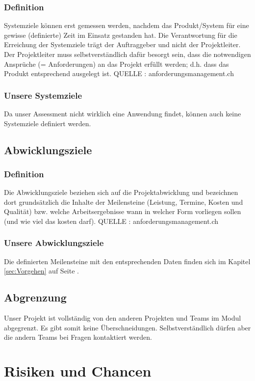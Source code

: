\subsubsection{Definition}
Systemziele können erst gemessen werden, nachdem das Produkt/System für eine gewisse (definierte) Zeit im Einsatz gestanden hat. Die Verantwortung für die Erreichung der Systemziele trägt der Auftraggeber und nicht der Projektleiter.\\
Der Projektleiter muss selbstverständlich dafür besorgt sein, dass die notwendigen Ansprüche (= Anforderungen) an das Projekt erfüllt werden; d.h. dass das Produkt entsprechend ausgelegt ist.
QUELLE : anforderungsmanagement.ch

\subsubsection{Unsere Systemziele}
Da unser Assessment nicht wirklich eine Anwendung findet, können auch keine Systemziele definiert werden. 
\subsection{Abwicklungsziele}
\subsubsection{Definition}
Die Abwicklungsziele beziehen sich auf die Projektabwicklung und bezeichnen dort grundsätzlich die Inhalte der Meilensteine (Leistung, Termine, Kosten und Qualität) bzw. welche Arbeitsergebnisse wann in welcher Form vorliegen sollen (und wie viel das kosten darf). QUELLE : anforderungsmanagement.ch
\subsubsection{Unsere Abwicklungsziele}
Die definierten Meilensteine mit den entsprechenden Daten finden sich im Kapitel \ref{sec:Vorgehen} auf Seite \pageref{sec:Vorgehen}. 
\subsection{Abgrenzung}
Unser Projekt ist vollständig von den anderen Projekten und Teams im Modul abgegrenzt. Es gibt somit keine Überschneidungen. Selbstverständlich dürfen aber die andern Teams bei Fragen kontaktiert werden.
\section{Risiken und Chancen}
